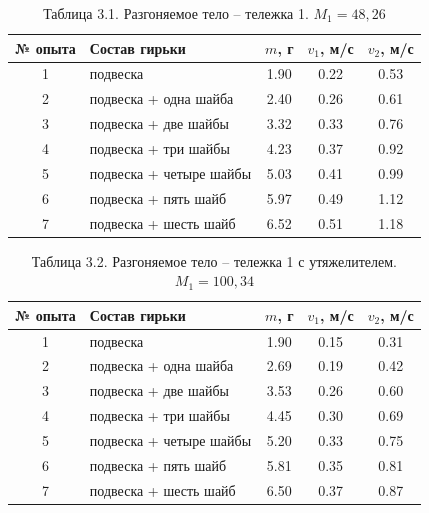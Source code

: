 \documentclass[12pt]{article}
\begin{document}
\begin{flushleft}
    \begin{table}[h]
        \centering
        \renewcommand{\arraystretch}{1.3}
        \setlength{\tabcolsep}{8pt}
        \captionsetup{justification=centering, font=bf}
        \caption{Таблица 3.1. Разгоняемое тело – тележка 1. $M_1 = 48{,}26$}
        \begin{tabular}{|c|l|c|c|c|}
            \hline
            № опыта & Состав гирьки & $m$, г & $v_1$, м/с & $v_2$, м/с \\
            \hline
            1 & подвеска & 1.90 & 0.22 & 0.53 \\
            \hline
            2 & подвеска + одна шайба & 2.40 & 0.26 & 0.61 \\
            \hline
            3 & подвеска + две шайбы & 3.32 & 0.33 & 0.76 \\
            \hline
            4 & подвеска + три шайбы & 4.23 & 0.37 & 0.92 \\
            \hline
            5 & подвеска + четыре шайбы & 5.03 & 0.41 & 0.99 \\
            \hline
            6 & подвеска + пять шайб & 5.97 & 0.49 & 1.12 \\
            \hline
            7 & подвеска + шесть шайб & 6.52 & 0.51 & 1.18 \\
            \hline
        \end{tabular}
    \end{table}
    
    \begin{table}[h]
        \centering
        \renewcommand{\arraystretch}{1.3}
        \setlength{\tabcolsep}{8pt}
        \captionsetup{justification=centering, font=bf}
        \caption{Таблица 3.2. Разгоняемое тело – тележка 1 с утяжелителем. $M_1 = 100{,}34$}
        \begin{tabular}{|c|l|c|c|c|}
            \hline
            № опыта & Состав гирьки & $m$, г & $v_1$, м/с & $v_2$, м/с \\
            \hline
            1 & подвеска & 1.90 & 0.15 & 0.31 \\
            \hline
            2 & подвеска + одна шайба & 2.69 & 0.19 & 0.42 \\
            \hline
            3 & подвеска + две шайбы & 3.53 & 0.26 & 0.60 \\
            \hline
            4 & подвеска + три шайбы & 4.45 & 0.30 & 0.69 \\
            \hline
            5 & подвеска + четыре шайбы & 5.20 & 0.33 & 0.75 \\
            \hline
            6 & подвеска + пять шайб & 5.81 & 0.35 & 0.81 \\
            \hline
            7 & подвеска + шесть шайб & 6.50 & 0.37 & 0.87 \\
            \hline
        \end{tabular}
    \end{table}
\end{flushleft}
\end{document}
